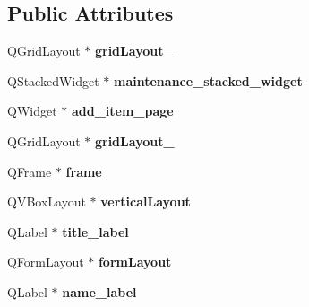 \subsection*{Public Attributes}
\begin{DoxyCompactItemize}
\item 
\mbox{\label{class_ui__maintenance_ad11afee85bdcb2af776a3dd4766bec7b}} 
Q\+Grid\+Layout $\ast$ {\bfseries grid\+Layout\+\_}
\item 
\mbox{\label{class_ui__maintenance_afb9597d153d8f5390d8e93396c765800}} 
Q\+Stacked\+Widget $\ast$ {\bfseries maintenance\+\_\+stacked\+\_\+widget}
\item 
\mbox{\label{class_ui__maintenance_aa8cb8f7076cb9afddf2f7fb39117cf3f}} 
Q\+Widget $\ast$ {\bfseries add\+\_\+item\+\_\+page}
\item 
\mbox{\label{class_ui__maintenance_a1ff9a605a3105ee1bf6d709ecdfd3754}} 
Q\+Grid\+Layout $\ast$ {\bfseries grid\+Layout\+\_}
\item 
\mbox{\label{class_ui__maintenance_ab167984b9127226d6c2fce14746a779a}} 
Q\+Frame $\ast$ {\bfseries frame}
\item 
\mbox{\label{class_ui__maintenance_af0e405577ef8dddbceb73b81d766f3a4}} 
Q\+V\+Box\+Layout $\ast$ {\bfseries vertical\+Layout}
\item 
\mbox{\label{class_ui__maintenance_ae534ca1063b3f0ae763699b3dffab617}} 
Q\+Label $\ast$ {\bfseries title\+\_\+label}
\item 
\mbox{\label{class_ui__maintenance_a91d35660de22845c5a0a0bca85911828}} 
Q\+Form\+Layout $\ast$ {\bfseries form\+Layout}
\item 
\mbox{\label{class_ui__maintenance_a0de4d84d208a7e194dc31d397c884e75}} 
Q\+Label $\ast$ {\bfseries name\+\_\+label}
\item 
\mbox{\label{class_ui__maintenance_aed58a70e94fc7c3dc6724af0c47e40b6}} 

\end{DoxyCompactItemize}
